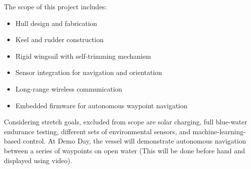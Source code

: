The scope of this project includes:
\begin{itemize}
    \item Hull design and fabrication
    \item Keel and rudder construction
    \item Rigid wingsail with self-trimming mechanism
    \item Sensor integration for navigation and orientation
    \item Long-range wireless communication
    \item Embedded firmware for autonomous waypoint navigation
\end{itemize}
Considering stretch goals, excluded from scope are solar charging, full blue-water endurance testing, different sets of environmental sensors, and machine-learning-based control. At Demo Day, the vessel will demonstrate autonomous navigation between a series of waypoints on open water (This will be done before hand and displayed using video).

